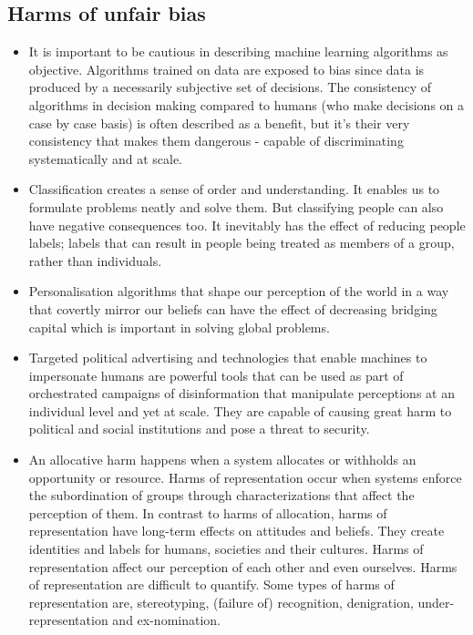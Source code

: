 \subsection*{Harms of unfair bias}

\begin{itemize}[leftmargin=*]
\item It is important to be cautious in describing machine learning algorithms as objective. Algorithms trained on data are exposed to bias since data is produced by a necessarily subjective set of decisions. The consistency of algorithms in decision making compared to humans (who make decisions on a case by case basis) is often described as a benefit, but it's their very consistency that makes them dangerous - capable of discriminating systematically and at scale.
%
\item Classification creates a sense of order and understanding. It enables us to formulate problems neatly and solve them. But classifying people can also have negative consequences too. It inevitably has the effect of reducing people labels; labels that can result in people being treated as members of a group, rather than individuals.
%
\item Personalisation algorithms that shape our perception of the world in a way that covertly mirror our beliefs can have the effect of decreasing bridging capital which is important in solving global problems.
%
\item Targeted political advertising and technologies that enable machines to impersonate humans are powerful tools that can be used as part of orchestrated campaigns of disinformation that manipulate perceptions at an individual level and yet at scale. They are capable of causing great harm to political and social institutions and pose a threat to security. 
%
\item An allocative harm happens when a system allocates or withholds an opportunity or resource. Harms of representation occur when systems enforce the subordination of groups through characterizations that affect the perception of them. In contrast to harms of allocation, harms of representation have long-term effects on attitudes and beliefs. They create identities and labels for humans, societies and their cultures. Harms of representation affect our perception of each other and even ourselves. Harms of representation are difficult to quantify. Some types of harms of representation are, stereotyping, (failure of) recognition, denigration, under-representation and ex-nomination.
\end{itemize}

